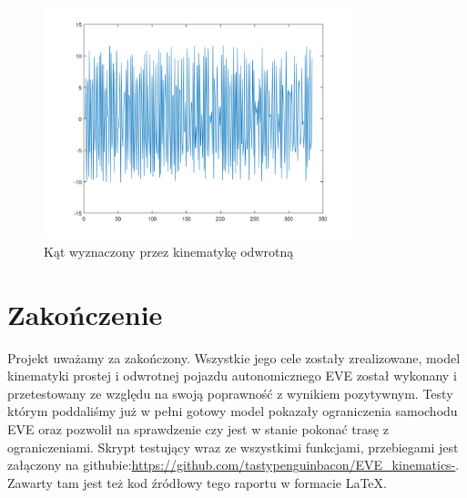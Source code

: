 \documentclass[a4paper, 12pt]{report}
\begin{document}
				\begin{figure}[H]
					\centering
					\includegraphics[width = 0.8\textwidth]{./AP/img/rev/gauss_in_3.png}
					\caption{Kąt wyznaczony przez kinematykę odwrotną}
				\end{figure}
			\newpage
	\chapter{Zakończenie}
		Projekt uważamy za zakończony. Wszystkie jego cele zostały zrealizowane, model kinematyki prostej i odwrotnej pojazdu autonomicznego EVE został wykonany i przetestowany ze względu na swoją poprawność z wynikiem pozytywnym. Testy którym poddaliśmy już w pełni gotowy model pokazały ograniczenia samochodu EVE oraz pozwolił na sprawdzenie czy jest w stanie pokonać trasę z ograniczeniami.
		\newline 
		\newline
		Skrypt testujący wraz ze wszystkimi funkcjami, przebiegami jest załączony na githubie:\linebreak \url{https://github.com/tastypenguinbacon/EVE_kinematics-}. Zawarty tam jest też kod źródłowy tego raportu w formacie \LaTeX.
\end{document}
